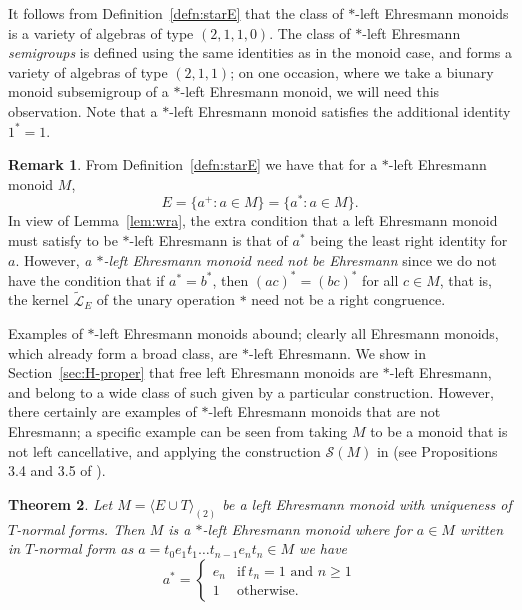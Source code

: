 \documentclass[12pt]{amsart}
\newtheorem{them}{Theorem}[section]
\theoremstyle{definition}
\newtheorem{rem}[them]{Remark}
\theoremstyle{definition}
\numberwithin{them}{section}
\numberwithin{equation}{section}
\begin{document}
 It follows from Definition~\ref{defn:starE}  that the class of $*$-left   Ehresmann monoids is a variety of algebras of type $(2,1,1,0)$.  The class of $*$-left Ehresmann {\em semigroups} is defined using the same identities as in the monoid case, and forms a variety of algebras of type $(2,1,1)$; on one occasion, where we take a biunary monoid subsemigroup of a $*$-left Ehresmann monoid, we will need this observation.  Note that a $*$-left   Ehresmann monoid satisfies the additional identity $1^*=1$.


\begin{rem}\label{rem:starE} From Definition~\ref{defn:starE} we have that for a $*$-left Ehresmann monoid $M$,
\[E=\{ a^+:a\in M\}=\{ a^*:a\in M\}.\]In view of Lemma~\ref{lem:wra},
the extra condition that a left Ehresmann monoid must satisfy to be $*$-left Ehresmann is that  of $a^*$ being   the least right identity for $a$. However,  {\em  a $*$-left Ehresmann monoid need not be Ehresmann} since we do not have the condition that if $a^*=b^*$, then $(ac)^*=(bc)^*$ for all $c\in M$, that is, the kernel $\widetilde{\mathcal{L}}_E$ of the unary operation $*$ need not be a right congruence. 
\end{rem}



 Examples of $*$-left Ehresmann monoids abound; clearly all Ehresmann monoids, which already form a broad class, are $*$-left Ehresmann. We show in Section~\ref{sec:H-proper} that free left Ehresmann monoids are $*$-left Ehresmann, and belong to a wide class of such given by a particular construction.  However, there certainly are examples of $*$-left Ehresmann monoids that are not Ehresmann; a specific example can be seen from taking $M$ to be a  monoid that is not left cancellative, and applying the construction $\mathcal{S}(M)$ in \cite{GJ} (see Propositions 3.4 and 3.5 of \cite{GJ}). 


\begin{them}\label{rightAdequate}
Let $M = \langle E \cup T\rangle_{(2)}$ be a left Ehresmann monoid with uniqueness of $T$-normal forms. Then $M$ is a $*$-left Ehresmann  monoid where  for  $a \in M$ written in $T$-normal form as $a= t_0e_1t_1\dots t_{n-1}e_{n}t_n \in M$ we have
 $$a^*=
\begin{cases}
    e_n & \mbox{if}\ t_n=1\mbox{ and }n\geq 1\\
	1 & \mbox{otherwise}.
\end{cases}$$

\end{them}
\end{document}

